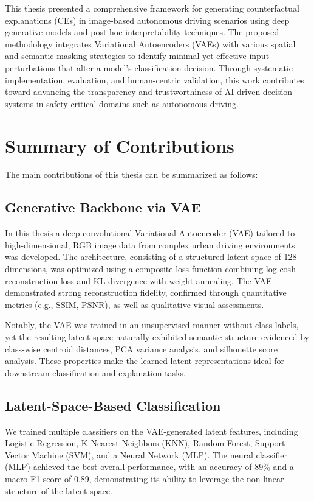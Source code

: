 This thesis presented a comprehensive framework for generating counterfactual explanations (CEs) in image-based autonomous driving scenarios using deep generative models and post-hoc interpretability techniques. The proposed methodology integrates Variational Autoencoders (VAEs) with various spatial and semantic masking strategies to identify minimal yet effective input perturbations that alter a model’s classification decision. Through systematic implementation, evaluation, and human-centric validation, this work contributes toward advancing the transparency and trustworthiness of AI-driven decision systems in safety-critical domains such as autonomous driving.

\section{Summary of Contributions}
The main contributions of this thesis can be summarized as follows:

\subsection{Generative Backbone via VAE}

In this thesis a deep convolutional Variational Autoencoder (VAE) tailored to high-dimensional, RGB image data from complex urban driving environments was developed. The architecture, consisting of a structured latent space of 128 dimensions, was optimized using a composite loss function combining log-cosh reconstruction loss and KL divergence with weight annealing. The VAE demonstrated strong reconstruction fidelity, confirmed through quantitative metrics (e.g., SSIM, PSNR), as well as qualitative visual assessments.

Notably, the VAE was trained in an unsupervised manner without class labels, yet the resulting latent space naturally exhibited semantic structure evidenced by class-wise centroid distances, PCA variance analysis, and silhouette score analysis. These properties make the learned latent representations ideal for downstream classification and explanation tasks.

\subsection{Latent-Space-Based Classification}
We trained multiple classifiers on the VAE-generated latent features, including Logistic Regression, K-Nearest Neighbors (KNN), Random Forest, Support Vector Machine (SVM), and a Neural Network (MLP). The neural classifier (MLP) achieved the best overall performance, with an accuracy of 89\% and a macro F1-score of 0.89, demonstrating its ability to leverage the non-linear structure of the latent space.

